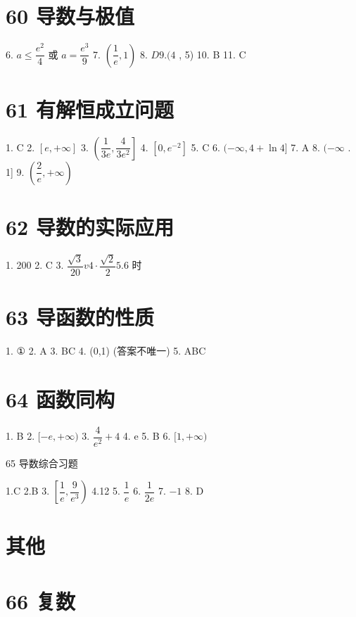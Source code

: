 \documentclass[10pt]{article}
\begin{document}
\section*{60 导数与极值}

6. $a \leq  \dfrac{{{e}}^{2}}{4}$ 或 $a = \dfrac{{{e}}^{3}}{9}$ 7. $\left( {\dfrac{1}{{e}},1}\right) $ 8. ${D}9.(4$ , 5) 10. B 11. C

\section*{61 有解恒成立问题}

1. C 2. $\left\lbrack  {{e}, + \infty }\right\rbrack  $ 3. $\left( {\dfrac{1}{3{e}},\dfrac{4}{3{{e}}^{2}}}\right\rbrack  $ 4. $\left\lbrack  {0,{{e}}^{-2}}\right\rbrack  $ 5. C 6. $( - \infty ,4 + \ln 4\rbrack $ 7. A 8. $( - \infty$ . 1] 9. $\left( {\dfrac{2}{{e}}, + \infty }\right)$

\section*{62 导数的实际应用}

1. 200 2. C 3. $\dfrac{\sqrt{3}}{20}v4 \cdot  \dfrac{\sqrt{2}}{2}{5.6}$ 时

\section*{63 导函数的性质}

1. ① 2. A 3. BC 4. (0,1) (答案不唯一) 5. ABC

\section*{64 函数同构}

1. B 2. $\lbrack  - {e}, + \infty )$ 3. $\dfrac{4}{{{e}}^{2}} + 4$ 4. e 5. B 6. $\lbrack 1, + \infty )$

65 导数综合习题

1.C 2.B 3. $\left\lbrack  {\dfrac{1}{{e}},\dfrac{9}{{{e}}^{3}}}\right) $ 4.12 5. $\dfrac{1}{{e}}$ 6. $\dfrac{1}{2{e}}$ 7. $- 1$ 8. D

\section*{其他}

\section*{66 复数}
\end{document}
